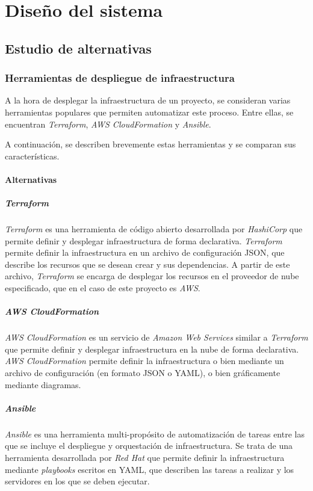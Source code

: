 \chapter{Diseño del sistema}\label{chap:diseño}
\section{Estudio de alternativas}\label{sec:estudio}
\subsection{Herramientas de despliegue de infraestructura}\label{subsec:herdesinf}
A la hora de desplegar la infraestructura de un proyecto, se consideran varias
herramientas populares que permiten automatizar este proceso. Entre ellas, se
encuentran \textit{Terraform}, \textit{AWS CloudFormation} y \textit{Ansible}.

A continuación, se describen brevemente estas herramientas y se comparan sus
características.

\subsubsection{Alternativas}
\paragraph{Terraform}
\textit{Terraform} es una herramienta de código abierto desarrollada por
\textit{HashiCorp} que permite definir y desplegar infraestructura de forma
declarativa. \textit{Terraform} permite definir la infraestructura en un archivo
de configuración JSON, que describe los recursos que se desean crear y sus
dependencias. A partir de este archivo, \textit{Terraform} se encarga de
desplegar los recursos en el proveedor de nube especificado, que en el caso de
este proyecto es \textit{AWS}.

\paragraph{AWS CloudFormation}
\textit{AWS CloudFormation} es un servicio de \textit{Amazon Web Services} similar
a \textit{Terraform} que permite definir y desplegar infraestructura en la nube
de forma declarativa. \textit{AWS CloudFormation} permite definir la infraestructura
o bien mediante un archivo de configuración (en formato JSON o YAML), o bien gráficamente
mediante diagramas.

\paragraph{Ansible}
\textit{Ansible} es una herramienta multi-propósito de automatización de tareas entre
las que se incluye el despliegue y orquestación de infraestructura. Se trata de una
herramienta desarrollada por \textit{Red Hat} que permite definir la infraestructura
mediante \textit{playbooks} escritos en YAML, que describen las tareas a realizar y
los servidores en los que se deben ejecutar.

